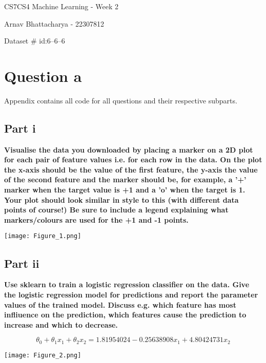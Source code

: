 \documentclass[10pt]{article}
\begin{document}
{\centering
    CS7CS4 Machine Learning - Week 2
    \par
    Arnav Bhattacharya - 22307812
    \par
    Dataset \# id:6--6--6 
    \par
}
\section*{Question a}
Appendix contains all code for all questions and their respective subparts.

\subsection*{Part i}

\textbf{Visualise the data you downloaded by placing a marker on a 2D plot for each pair of feature values i.e. for each row in the data. On the plot the x-axis should be the value of the first feature, the y-axis the value of the second feature and the marker should be, for example, a '+' marker when the target value is +1 and a 'o' when the target is {\textendash}1. Your plot should look similar in style to this (with different data points of course!) Be sure to include a legend explaining what markers/colours are used for the +1 and -1 points.}

\vspace{5mm}
\begin{center}
  \texttt{[image: Figure\_1.png]}
\end{center}

\subsection*{Part ii}
\textbf{Use sklearn to train a logistic regression classifier on the data. Give the logistic
regression model for predictions and report the parameter values of the trained
model. Discuss e.g. which feature has most infliuence on the prediction, which
features cause the prediction to increase and which to decrease.}

\begin{equation*}
    \theta_{0} + \theta_{1}x_{1} + \theta_{2}x_{2} = 1.81954024 - 0.25638908x_{1} + 4.80424731x_{2}
\end{equation*}
\vspace{1mm}

\begin{center}
  \texttt{[image: Figure\_2.png]}
\end{center}
\end{document}
